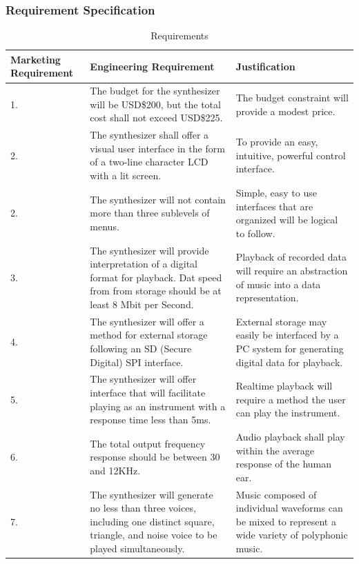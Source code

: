 \documentclass[bibtotocnumbered,abstract=on,paper=a4,fontsize=12pt,parskip=on,halfparskip=on]{scrartcl}		%
\begin{document}
    \subsubsection{Requirement Specification}
    \begin{table}[H]
      \caption{Requirements}
      \vskip 0.3cm
      \begin{tabularx}{\linewidth}{ p{2.0cm} X X }
        \textbf{Marketing Requirement} & \textbf{Engineering Requirement} & \textbf{Justification} \\
          \hline
        1. & The budget for the synthesizer will be USD\$200, but the total cost shall not exceed USD\$225. & The budget constraint will provide a modest price.\\
          \hline
        2. & The synthesizer shall offer a visual user interface in the form of a two-line character LCD with a lit screen. & To provide an easy, intuitive, powerful control interface.\\
          \hline
        2. & The synthesizer will not contain more than three sublevels of menus. & Simple, easy to use interfaces that are organized will be logical to follow.\\
          \hline
        3. & The synthesizer will provide interpretation of a digital format for playback. Dat speed from from storage should be at least 8 Mbit per Second. & Playback of recorded data will require an abstraction of  music into a data representation.\\
          \hline
        4. & The synthesizer will offer a method for external storage following an SD (Secure Digital) SPI interface. & External storage may easily be interfaced by a PC system for generating digital data for playback.\\
          \hline
        5. & The synthesizer will offer interface that will facilitate playing as an instrument with a response time less than 5ms. & Realtime playback will require a method the user can play the instrument.\\
          \hline
        6. & The total output frequency response should be between 30 and 12KHz. & Audio playback shall play within the average response of the human ear.\\
          \hline
        7. & The synthesizer will generate no less than three voices, including one distinct square, triangle, and noise voice to be played simultaneously. & Music composed of individual waveforms can be mixed to represent a wide variety of polyphonic music.\\
      \end{tabularx}
      \end{table}
\end{document}
